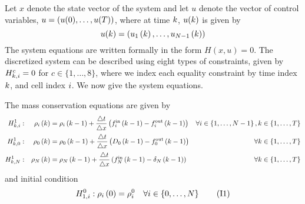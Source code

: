 Let $x$ denote the state vector of the system and let $u$ denote the vector of control variables, $u = (u(0), \dots, u(T))$, where at time $k$, $u(k)$ is given by
\[
u(k) = (u_{1}\left(k\right), \dots, u_{N-1}\left(k\right))
\]
The system equations are written formally in the form $H(x,u)=0$. The discretized system can be described using eight types of constraints, given by $H^{c}_{k, i} = 0$ for $c \in \{1, \dots, 8\}$, where we index each equality constraint by time index $k$, and cell index $i$. We now give the system equations.

\setcounter{oldequation}{\theequation}
\setcounter{equation}{0}
\renewcommand{\theequation}{H\arabic{equation}}

The mass conservation equations are given by 
\begin{subequations}
\begin{align}
H^{1}_{k, i}: && \rho_{i}\left(k\right) & =\rho_{i}\left(k-1\right)+\frac{\triangle t}{\triangle x}\left(f_{i}^{\text{in}}\left(k-1\right)-f_{i}^{\text{out}}\left(k-1\right)\right) & \forall i\in\left\{ 1,\ldots,N-1\right\} ,k\in\left\{ 1,\ldots,T\right\}
\label{eq:conservation1}
\\
H^{1}_{k, 0}: && \rho_{0}\left(k\right) & =\rho_{0}\left(k-1\right)+\frac{\triangle t}{\triangle x}\left(D_{0}\left(k-1\right)-f_{0}^{\text{out}}\left(k-1\right)\right) & \forall k\in\left\{ 1,\ldots,T\right\}
\label{eq:conservation2}
\\
H^{1}_{k, N}: && \rho_{N}\left(k\right) & =\rho_{N}\left(k-1\right)+\frac{\triangle t}{\triangle x}\left(\mbox{\ensuremath{f_{N}^{\text{in}}\left(k-1\right)}}-\delta_{N}\left(k-1\right)\right) & \forall k\in\left\{ 1,\ldots,T\right\}
\label{eq:conservation3}
\end{align}
\label{eq:conservation}
\end{subequations}
and initial condition 
\begin{align}
H^{0}_{1, i} : \rho_{i}\left(0\right) =\rho_{i}^{0} && \forall i\in\left\{ 0,\ldots,N\right\}
\tag{I1}
\label{eq:densityInit}
\end{align}



